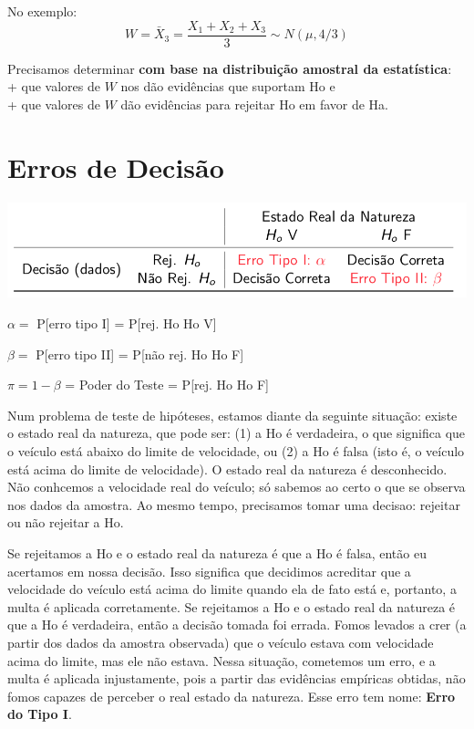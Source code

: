 \documentclass[
]{book}
\theoremstyle{definition}
\theoremstyle{definition}
\theoremstyle{definition}
\theoremstyle{remark}
\begin{document}
No exemplo:
\[W = \bar{X}_3 = \frac{X_1 + X_2 + X_3}{3} \sim N(\mu, 4/3)\]

Precisamos determinar \textbf{com base na distribuição amostral da estatística}:\\
+ que valores de \(W\) nos dão evidências que suportam Ho e\\
+ que valores de \(W\) dão evidências para rejeitar Ho em favor de Ha.

\hypertarget{erros-de-decisuxe3o}{%
\section{Erros de Decisão}\label{erros-de-decisuxe3o}}

\includegraphics[width=0.8\linewidth]{img/TH-erros-decisao}

\(\alpha =\) P{[}erro tipo I{]} = P{[}rej. Ho \textbar{} Ho V{]}

\(\beta =\) P{[}erro tipo II{]} = P{[}não rej. Ho \textbar{} Ho F{]}

\(\pi = 1-\beta\) = Poder do Teste = P{[}rej. Ho \textbar{} Ho F{]}

Num problema de teste de hipóteses, estamos diante da seguinte situação: existe o estado real da natureza, que pode ser: (1) a Ho é verdadeira, o que significa que o veículo está abaixo do limite de velocidade, ou (2) a Ho é falsa (isto é, o veículo está acima do limite de velocidade). O estado real da natureza é desconhecido. Não conhcemos a velocidade real do veículo; só sabemos ao certo o que se observa nos dados da amostra. Ao mesmo tempo, precisamos tomar uma decisao: rejeitar ou não rejeitar a Ho.

Se rejeitamos a Ho e o estado real da natureza é que a Ho é falsa, então eu acertamos em nossa decisão. Isso significa que decidimos acreditar que a velocidade do veículo está acima do limite quando ela de fato está e, portanto, a multa é aplicada corretamente. Se rejeitamos a Ho e o estado real da natureza é que a Ho é verdadeira, então a decisão tomada foi errada. Fomos levados a crer (a partir dos dados da amostra observada) que o veículo estava com velocidade acima do limite, mas ele não estava. Nessa situação, cometemos um erro, e a multa é aplicada injustamente, pois a partir das evidências empíricas obtidas, não fomos capazes de perceber o real estado da natureza. Esse erro tem nome: \textbf{Erro do Tipo I}.
\end{document}
